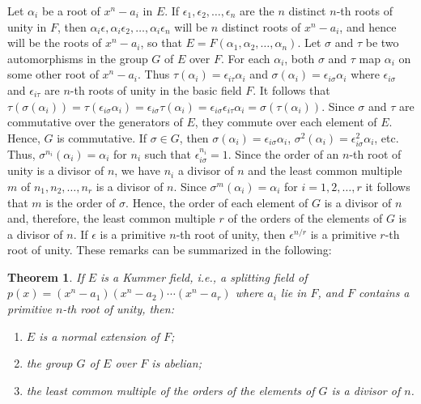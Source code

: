 \documentclass[10pt,leqno,a5paper]{book}
\newtheorem{theo}{Theorem}
\theoremstyle{definition}
\begin{document}
Let $\alpha_i$ be a root of $x^n - a_i$ in $E$.
If $\epsilon_1, \epsilon_2, \ldots, \epsilon_n$ are the $n$ distinct $n$-th roots of unity in $F$, then $\alpha_i \epsilon, \alpha_i \epsilon_2, \ldots, \alpha_i \epsilon_n$ will be $n$ distinct roots of $x^n - a_i$, and hence will be the roots of $x^n - a_i$, so that $E = F(\alpha_1, \alpha_2, \ldots, \alpha_n)$.
Let $\sigma$ and $\tau$ be two automorphisms in the group $G$ of $E$ over $F$.
For each $\alpha_i$, both $\sigma$ and $\tau$ map $\alpha_i$ on some other root of $x^n - a_i$.
Thus $\tau(\alpha_i) = \epsilon_{i\tau} \alpha_i$ and $\sigma(\alpha_i) = \epsilon_{i\sigma} \alpha_i$ where $\epsilon_{i\sigma}$ and $\epsilon_{i\tau}$ are $n$-th roots of unity in the basic field $F$.
It follows that $\tau(\sigma(\alpha_i)) = \tau(\epsilon_{i\sigma} \alpha_i) = \epsilon_{i\sigma} \tau(\alpha_i) = \epsilon_{i\sigma}\epsilon_{i\tau} \alpha_i = \sigma(\tau(\alpha_i))$.
Since $\sigma$ and $\tau$ are commutative over the generators of $E$, they commute over each element of $E$.
Hence, $G$ is commutative.
If $\sigma \in G$, then $\sigma(\alpha_i) = \epsilon_{i\sigma}\alpha_i$, $\sigma^2(\alpha_i) = \epsilon_{i\sigma}^2 \alpha_i$, etc.
Thus, $\sigma^{n_i}(\alpha_i) = \alpha_i$ for $n_i$ such that $\epsilon_{i\sigma}^{n_i} = 1$.
Since the order of an $n$-th root of unity is a divisor of $n$, we have $n_i$ a divisor of $n$ and the least common multiple $m$ of $n_1, n_2, \ldots, n_r$ is a divisor of $n$.
Since $\sigma^m(\alpha_i) = \alpha_i$ for $i = 1,2,\ldots, r$ it follows that $m$ is the order of $\sigma$.
Hence, the order of each element of $G$ is a divisor of $n$ and, therefore, the least common multiple $r$ of the orders of the elements of $G$ is a divisor of $n$.
If $\epsilon$ is a primitive $n$-th root of unity, then $\epsilon^{n/r}$ is a primitive $r$-th root of unity.
These remarks can be summarized in the following:


\begin{theo}
\label{theo:23}
If $E$ is a Kummer field, i.e., a splitting field of $p(x) = (x^n - a_1)(x^n - a_2) \cdots (x^n - a_r)$ where $a_i$ lie in $F$, and $F$ contains a primitive $n$-th root of unity, then:
\begin{enumerate}
\item
\label{theo:23a}
$E$ is a normal extension of $F$;

\item
\label{theo:23b}
the group $G$ of $E$ over $F$ is abelian;

\item
\label{theo:23c}
the least common multiple of the orders of the elements of $G$ is a divisor of $n$.
\end{enumerate}
\end{theo}
\end{document}
